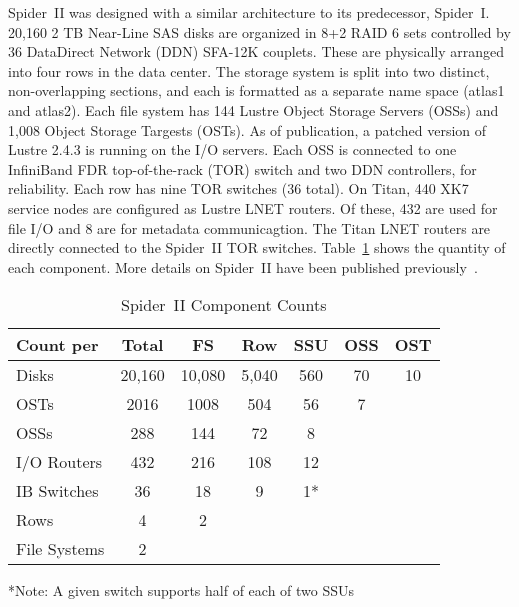 Spider~II was designed with a similar architecture to its predecessor,
Spider~I.  20,160 2 TB Near-Line SAS disks are organized in 8+2 RAID 6 sets
controlled by 36 DataDirect Network (DDN) SFA-12K couplets. These are
physically arranged into four rows in the data center.  The storage system is
split into two distinct, non-overlapping sections, and each is formatted as a
separate name space (atlas1 and atlas2). Each file system has 144 Lustre Object
Storage Servers (OSSs) and 1,008 Object Storage Targests (OSTs). As of
publication, a patched version of Lustre 2.4.3 is running on the I/O servers.
Each OSS is connected to one InfiniBand FDR top-of-the-rack (TOR) switch and
two DDN controllers, for reliability.  Each row has nine TOR switches (36
total).  On Titan, 440 XK7 service nodes are configured as Lustre LNET routers.
Of these, 432 are used for file I/O and 8 are for metadata communicagtion.  The
Titan LNET routers are directly connected to the Spider~II TOR switches.
Table~\ref{table:component-counts} shows the quantity of each component.  More
details on Spider~II have been published previously~\cite{atlas}.

\begin{table}
 \caption{Spider~II Component Counts}
 \label{table:component-counts}
 \begin{tabular}{ | l | c | c | c | c | c | c | }
  \hline
  Count per	& Total		& FS		& Row	& SSU	& OSS	& OST	\\ \hline
  Disks		& 20,160	& 10,080	& 5,040	& 560	& 70	& 10	\\ \hline
  OSTs		& 2016		& 1008		& 504	& 56	& 7	&	\\ \hline
  OSSs		& 288		& 144		& 72	& 8	&	&	\\ \hline
  I/O Routers	& 432		& 216		& 108	& 12	&	&	\\ \hline
  IB Switches	& 36		& 18		& 9	& 1*	&	&	\\ \hline
  Rows		& 4		& 2		&	&	&	&	\\ \hline
  File Systems	& 2		&		&	&	&	&	\\ \hline
 \end{tabular}
 *Note: A given switch supports half of each of two SSUs
\end{table}

